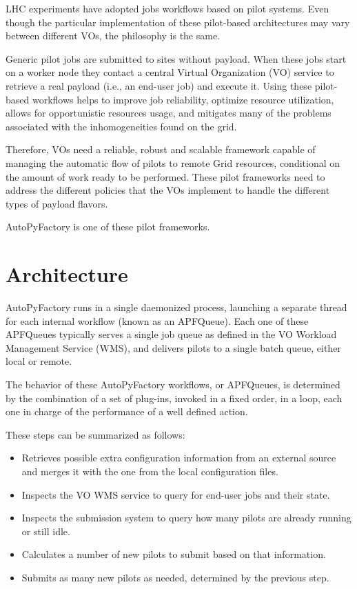 \documentclass[a4paper]{jpconf}
\begin{document}
LHC experiments have adopted jobs workflows based on pilot systems.
Even though the particular implementation of these pilot-based architectures may
vary between different VOs, the philosophy is the same. 

Generic pilot jobs are submitted to sites without payload. 
When these jobs start on a worker node they contact a central Virtual Organization (VO)
service to retrieve a real payload (i.e., an end-user job) and execute it.
Using these pilot-based workflows helps to improve job reliability,
optimize resource utilization, allows for opportunistic resources usage, 
and mitigates many of the problems associated with the inhomogeneities found on the grid.

Therefore, VOs need a reliable, robust and scalable
framework capable of managing the automatic flow of pilots to remote Grid
resources, conditional on the amount of work ready to be performed.
These pilot frameworks need to address the different policies that the VOs
implement to handle the different types of payload flavors.

AutoPyFactory is one of these pilot frameworks.


\section{Architecture}

AutoPyFactory runs in a single daemonized process,
launching a separate thread for each internal workflow (known as an APFQueue).
Each one of these APFQueues typically serves a single job queue 
as defined in the VO Workload Management Service (WMS), 
and delivers pilots to a single batch queue, either local or remote. 

The behavior of these AutoPyFactory workflows, or APFQueues,
is determined by the combination of a set of plug-ins, 
invoked in a fixed order, in a loop, each one in charge of the performance of a well defined action.

These steps can be summarized as follows:
\begin{itemize}
    \item Retrieves possible extra configuration information from an external source 
          and merges it with the one from the local configuration files.
    \item Inspects the VO WMS service to query for end-user jobs and their state.
    \item Inspects the submission system to query how many pilots are already running or still idle.
    \item Calculates a number of new pilots to submit based on that information.
    \item Submits as many new pilots as needed, determined by the previous step.
\end{itemize}
\end{document}
